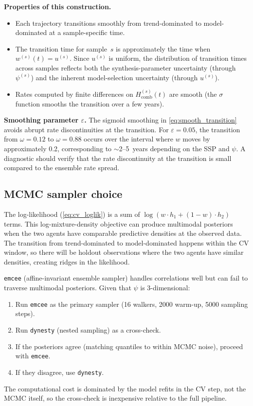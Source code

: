 \documentclass[11pt]{article}
\begin{document}
\textbf{Properties of this construction.}
\begin{itemize}
  \item Each trajectory transitions smoothly from trend-dominated to model-dominated at a sample-specific time.
  \item The transition time for sample~$s$ is approximately the time when $w^{(s)}(t) = u^{(s)}$.  Since $u^{(s)}$ is uniform, the distribution of transition times across samples reflects both the synthesis-parameter uncertainty (through $\psi^{(s)}$) and the inherent model-selection uncertainty (through $u^{(s)}$).
  \item Rates computed by finite differences on $H_{\mathrm{comb}}^{(s)}(t)$ are smooth (the $\sigma$ function smooths the transition over a few years).
\end{itemize}

\textbf{Smoothing parameter $\varepsilon$.}  The sigmoid smoothing in \cref{eq:smooth_transition} avoids abrupt rate discontinuities at the transition.  For $\varepsilon = 0.05$, the transition from $\omega = 0.12$ to $\omega = 0.88$ occurs over the interval where $w$ moves by approximately 0.2, corresponding to $\sim$2--5~years depending on the SSP and $\psi$.  A diagnostic should verify that the rate discontinuity at the transition is small compared to the ensemble rate spread.


\subsection{MCMC sampler choice}
\label{sec:sampler_choice}

The log-likelihood (\cref{eq:cv_loglik}) is a sum of $\log(w \cdot h_1 + (1-w) \cdot h_2)$ terms.  This log-mixture-density objective can produce multimodal posteriors when the two agents have comparable predictive densities at the observed data.  The transition from trend-dominated to model-dominated happens within the CV window, so there will be holdout observations where the two agents have similar densities, creating ridges in the likelihood.

\texttt{emcee} (affine-invariant ensemble sampler) handles correlations well but can fail to traverse multimodal posteriors.  Given that $\psi$ is 3-dimensional:
\begin{enumerate}
  \item Run \texttt{emcee} as the primary sampler (16 walkers, 2000 warm-up, 5000 sampling steps).
  \item Run \texttt{dynesty} (nested sampling) as a cross-check.
  \item If the posteriors agree (matching quantiles to within MCMC noise), proceed with \texttt{emcee}.
  \item If they disagree, use \texttt{dynesty}.
\end{enumerate}
The computational cost is dominated by the model refits in the CV step, not the MCMC itself, so the cross-check is inexpensive relative to the full pipeline.
\end{document}
